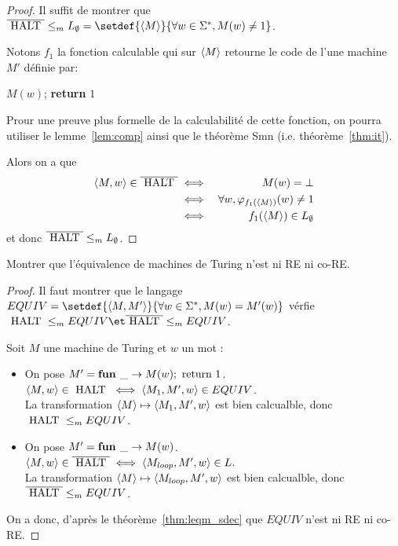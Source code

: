 \begin{proof}
	Il suffit de montrer que $\overline{\halt} \leqm L_{\emptyset} = \setdef{\encode M} {\forall w \in \mots, M(w) \neq 1}$.

	Notons $f_1$ la fonction calculable qui sur $\left\langle M\right\rangle$ retourne le code de l'une machine $M'$ définie par:
	\begin{algorithmic}[lines]
		\State $M(w)$;
		\State \textbf{return} $1$
		\EndFunction
	\end{algorithmic}
	Prour une preuve plus formelle de la calculabilité de cette fonction, on pourra utiliser le lemme~\ref{lem:comp}
	ainsi que le théorème Smn (i.e. théorème~\ref{thm:it}).

	Alors on a que
	\begin{eqnarray*}
		\left\langle M,w\right\rangle \in \overline{\text{ HALT }} &\iff& M(w) = \bot \\
		&\iff& \forall w, \varphi_{f_1(\left\langle M\right\rangle)}(w) \neq 1 \\
		&\iff& f_1(\left\langle M\right\rangle) \in L_{\emptyset}
	\end{eqnarray*} et donc $\overline{\text{ HALT }} \leq_m L_{\emptyset}$.

\end{proof}


\begin{exercice}
	Montrer que l'équivalence de machines de Turing n'est ni RE ni co-RE.
\end{exercice}

\begin{proof}
	Il faut montrer que le langage $EQUIV =  \setdef {\encode {M,M'}} {\forall w \in \mots, M(w) = M'(w)}$ vérfie
	$\halt \leqm EQUIV \et \overline{\halt} \leqm EQUIV$.

	Soit $M$ une machine de Turing et $w$ un mot :
	\begin{itemize}
		\item On pose $M' =  \textbf{fun } \_ \rightarrow M(w); \text{ return } 1$. \\
		      $\left\langle M,w\right\rangle \in \text{ HALT } \iff \left\langle M_1, M', w\right\rangle \in EQUIV$. \\
			La transformation $\left\langle M\right\rangle \mapsto \left\langle M_1, M', w\right\rangle$ est bien calcualble, donc $\text{ HALT } \leq_m EQUIV$.
		\item  On pose $M' =  \textbf{fun } \_ \rightarrow M(w)$. \\
		      $\left\langle M,w\right\rangle \in \overline{\text{ HALT }} \iff \left\langle M_{loop}, M', w\right\rangle \in L$. \\
			La transformation $\left\langle M\right\rangle \mapsto \left\langle M_{loop}, M', w\right\rangle$ est bien calcualble, donc $\overline{\text{ HALT }} \leq_m EQUIV$.
	\end{itemize}

	On a donc, d'après le théorème~\ref{thm:leqm_sdec} que $EQUIV$ n'est ni RE ni co-RE.
\end{proof}


